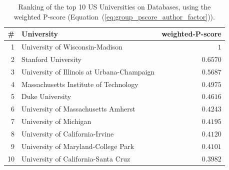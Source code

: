 \documentclass[msc]{ppgccufmg}
\begin{document}
\begin{table}[htbp]
\centering
\caption{Ranking of the top 10 US Universities on Databases, using the weighted P-score (Equation~(\ref{eq:group_pscore_author_factor})).}
\label{tab:top10-db}
\begin{tabular}{rlr}
    \toprule
    \# & University                                 & \multicolumn{1}{c}{weighted-P-score} \\
    \midrule
    1    & University of Wisconsin-Madison                & $1$        \\
    2    & Stanford University                            & $0.6570$    \\
    3    & University of Illinois at Urbana-Champaign    & $0.5687$    \\
    4    & Massachusetts Institute of Technology            & $0.4975$    \\
    5    & Duke University                                & $0.4616$    \\
    6    & University of Massachusetts Amherst            & $0.4243$    \\
    7    & University of Michigan                        & $0.4195$    \\
    8    & University of California-Irvine                & $0.4120$    \\
    9    & University of Maryland-College Park            & $0.4101$    \\
    10    & University of California-Santa Cruz            & $0.3982$    \\
    \bottomrule
\end{tabular}
\end{table}
\end{document}
